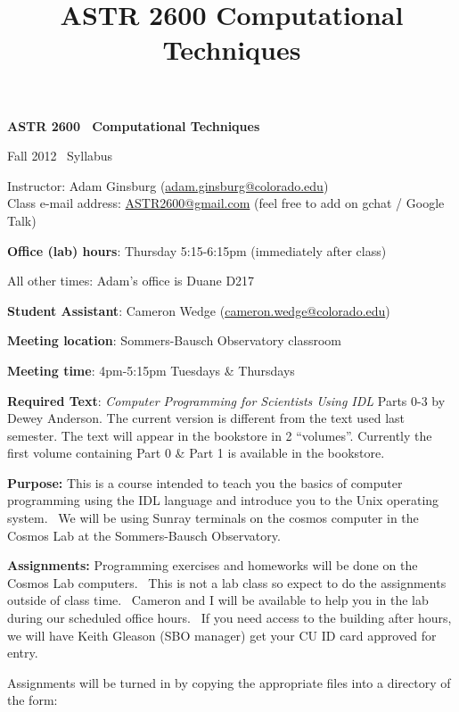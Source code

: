 \documentclass[]{article}
\title{ASTR 2600 Computational Techniques}
\author{}
\date{}
\begin{document}

\begin{center} \textbf{\large ASTR 2600~ Computational Techniques}

{ Fall 2012~ Syllabus}
\end{center}


Instructor: Adam Ginsburg (\url{adam.ginsburg@colorado.edu}) \\
Class e-mail address: \url{ASTR2600@gmail.com} (feel free to add on gchat / Google Talk)

\textbf{Office (lab) hours}: 
    Thursday 5:15-6:15pm (immediately after class)

All other times: Adam's office is Duane D217

\textbf{Student Assistant}: Cameron Wedge (\url{cameron.wedge@colorado.edu})

\textbf{Meeting location}: Sommers-Bausch Observatory classroom

\textbf{Meeting time}: 4pm-5:15pm Tuesdays \& Thursdays

\textbf{Required Text}: \emph{Computer Programming for Scientists Using IDL} Parts 0-3
by Dewey Anderson.  The current version is different from the text used last
semester.  The text will appear in the bookstore in 2 ``volumes''.  Currently
the first volume containing Part 0 \& Part 1 is available in the bookstore.



\textbf{Purpose:} This is a course intended to teach you the basics of
computer programming using the IDL language and introduce you to the
Unix operating system.~ We will be using Sunray terminals on the cosmos
computer in the Cosmos Lab at the Sommers-Bausch Observatory.


\textbf{Assignments:} Programming exercises and homeworks will be done
on the Cosmos Lab computers.~ This is not a lab class so expect to do
the assignments outside of class time.~ Cameron and I will be available
to help you in the lab during our scheduled office hours.~ If you need
access to the building after hours, we will have Keith Gleason (SBO
manager) get your CU ID card approved for entry.


Assignments will be turned in by copying the appropriate files into
a directory of the form:
\end{document}
